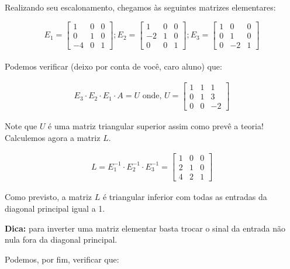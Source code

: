 \documentclass[12pt]{article}
\begin{document}
	Realizando seu escalonamento, chegamos às seguintes matrizes elementares:
	
	\begin{equation*}
		E_1=\begin{bmatrix}
			1 & 0 & 0\\
			0 & 1 & 0\\
			-4 & 0 & 1
		\end{bmatrix} ;
		E_2=
		\begin{bmatrix}
			1 & 0 & 0\\
			-2 & 1 & 0\\
			0 & 0 & 1
		\end{bmatrix};
		E_3=
		\begin{bmatrix}
			1 & 0 & 0\\
			0 & 1 & 0\\
			0 &-2 & 1
		\end{bmatrix}
	\end{equation*}\\
	
	Podemos verificar (deixo por conta de você, caro aluno) que:
	
	\begin{align*}
		E_3\cdot E_2\cdot E_1\cdot A=U \mbox{ onde, }
		U=
		\begin{bmatrix}
			1 & 1 & 1\\
			0 & 1 & 3\\
			0 & 0 & -2
		\end{bmatrix}
	\end{align*}	
	
	Note que $U$ é uma matriz triangular superior assim como prevê a teoria! Calculemos agora a matriz $L$.
	
	\begin{align}
		L=E_1^{-1}\cdot E_2^{-1}\cdot E_3^{-1}=
		\begin{bmatrix}
			1 & 0 & 0\\
			2 & 1 & 0\\
			4 & 2 & 1
		\end{bmatrix}
	\end{align}
	
	Como previsto, a matriz $L$ é triangular inferior com todas as entradas da diagonal principal igual a 1.
	
	\textbf{Dica:} para inverter uma matriz elementar basta trocar o sinal da entrada não nula fora da diagonal principal. 
	
	Podemos, por fim, verificar que:
	
\end{document}
